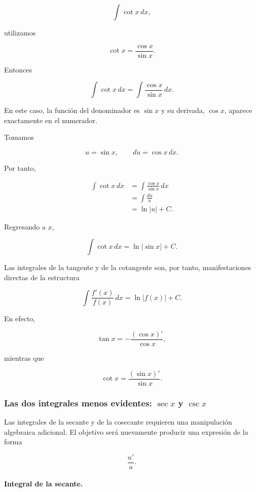 \documentclass[12pt]{article}
\theoremstyle{definition}
\theoremstyle{remark}
\begin{document}
\[
\int\cot x\,dx,
\]

utilizamos

\[
\cot x=\frac{\cos x}{\sin x}.
\]

Entonces

\[
\int\cot x\,dx
=
\int\frac{\cos x}{\sin x}\,dx.
\]

En este caso, la función del denominador es \(\sin x\) y su
derivada, \(\cos x\), aparece exactamente en el numerador.

Tomamos

\[
u=\sin x,
\qquad
du=\cos x\,dx.
\]

Por tanto,

\begin{align*}
\int\cot x\,dx
&=
\int\frac{\cos x}{\sin x}\,dx\\[1mm]
&=
\int\frac{du}{u}\\[1mm]
&=
\ln|u|+C.
\end{align*}

Regresando a \(x\),

\[
\boxed{
\int\cot x\,dx
=
\ln|\sin x|+C.
}
\]

Las integrales de la tangente y de la cotangente son, por tanto,
manifestaciones directas de la estructura

\[
\boxed{
\int\frac{f'(x)}{f(x)}\,dx
=
\ln|f(x)|+C.
}
\]

En efecto,

\[
\tan x
=
-\frac{(\cos x)'}{\cos x},
\]

mientras que

\[
\cot x
=
\frac{(\sin x)'}{\sin x}.
\]

\subsubsection*{Las dos integrales menos evidentes:
\(\sec x\) y \(\csc x\)}

Las integrales de la secante y de la cosecante requieren una
manipulación algebraica adicional. El objetivo será nuevamente
producir una expresión de la forma

\[
\frac{u'}{u}.
\]

\paragraph{Integral de la secante.}
\end{document}
